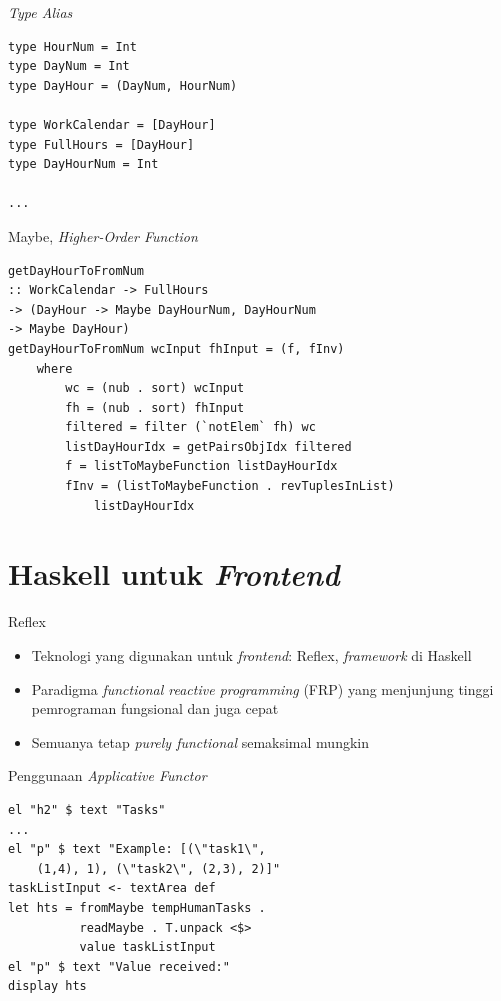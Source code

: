 \documentclass{beamer}
\begin{document}
\begin{frame}[fragile]{\textit{Type Alias}}
\begin{verbatim}
type HourNum = Int
type DayNum = Int
type DayHour = (DayNum, HourNum)

type WorkCalendar = [DayHour]
type FullHours = [DayHour]
type DayHourNum = Int

...
\end{verbatim}
\end{frame}

\begin{frame}[fragile]{Maybe, \textit{Higher-Order Function}}
\begin{verbatim}
getDayHourToFromNum
:: WorkCalendar -> FullHours
-> (DayHour -> Maybe DayHourNum, DayHourNum 
-> Maybe DayHour)
getDayHourToFromNum wcInput fhInput = (f, fInv)
    where
        wc = (nub . sort) wcInput
        fh = (nub . sort) fhInput
        filtered = filter (`notElem` fh) wc
        listDayHourIdx = getPairsObjIdx filtered
        f = listToMaybeFunction listDayHourIdx
        fInv = (listToMaybeFunction . revTuplesInList)
            listDayHourIdx
\end{verbatim}
\end{frame}

\section{Haskell untuk \textit{Frontend}}

\begin{frame}{Reflex}
    \begin{itemize}
        \item Teknologi yang digunakan untuk \textit{frontend}: Reflex, \textit{framework} di Haskell
        \item Paradigma \textit{functional reactive programming} (FRP) yang menjunjung tinggi pemrograman fungsional dan juga cepat
        \item Semuanya tetap \textit{purely functional} semaksimal mungkin
    \end{itemize}
\end{frame}

\begin{frame}[fragile]{Penggunaan \textit{Applicative Functor}}
\begin{verbatim}
el "h2" $ text "Tasks"
...
el "p" $ text "Example: [(\"task1\",
    (1,4), 1), (\"task2\", (2,3), 2)]"
taskListInput <- textArea def
let hts = fromMaybe tempHumanTasks . 
          readMaybe . T.unpack <$>
          value taskListInput
el "p" $ text "Value received:"
display hts
\end{verbatim}
\end{frame}
\end{document}
